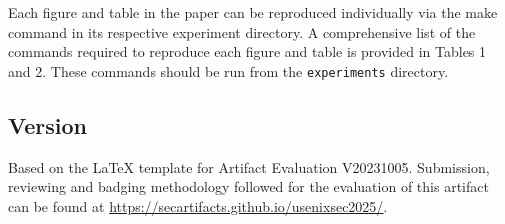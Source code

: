 Each figure and table in the paper can be reproduced
individually via the make command in its respective experiment directory.
A comprehensive list of the commands required to reproduce each figure and table is provided in
Tables 1 and 2. These commands should be run from the \texttt{experiments} directory.









\subsection{Version}
Based on the LaTeX template for Artifact Evaluation V20231005. Submission,
reviewing and badging methodology followed for the evaluation of this artifact
can be found at \url{https://secartifacts.github.io/usenixsec2025/}.